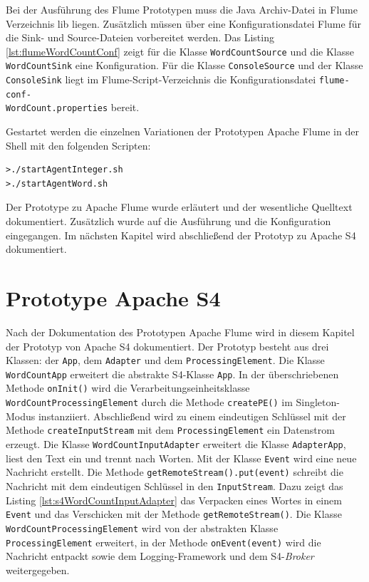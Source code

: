 Bei der Ausführung des Flume Prototypen muss die Java Archiv-Datei in Flume Verzeichnis lib liegen. Zusätzlich müssen über eine Konfigurationsdatei Flume für die Sink- und Source-Dateien vorbereitet werden. Das Listing \ref{lst:flumeWordCountConf} zeigt für die Klasse \texttt{WordCountSource} und die Klasse \texttt{WordCountSink} eine Konfiguration. Für die Klasse \texttt{ConsoleSource} und der Klasse \texttt{ConsoleSink} liegt im Flume-Script-Verzeichnis die Konfigurationsdatei \texttt{flume-conf- \\WordCount.properties} bereit.



Gestartet werden die einzelnen Variationen der Prototypen Apache Flume in der Shell mit den folgenden Scripten:

\begin{verbatim}
>./startAgentInteger.sh
>./startAgentWord.sh
\end{verbatim}

Der Prototype zu Apache Flume wurde erläutert und der wesentliche Quelltext dokumentiert. Zusätzlich wurde auf die Ausführung und die Konfiguration eingegangen. Im nächsten Kapitel wird abschließend der Prototyp zu Apache S4 dokumentiert.


\section{Prototype Apache S4}
\label{sec:prot:s4}

Nach der Dokumentation des Prototypen Apache Flume wird in diesem Kapitel der Prototyp von Apache S4 dokumentiert. Der Prototyp besteht aus drei Klassen: der \texttt{App}, dem \texttt{Adapter} und dem \texttt{ProcessingElement}. Die Klasse \texttt{WordCountApp} erweitert die abstrakte S4-Klasse \texttt{App}. In der überschriebenen Methode \texttt{onInit()} wird die Verarbeitungseinheitsklasse \texttt{WordCountProcessingElement} durch die Methode \texttt{createPE()} im Singleton-Modus instanziiert. Abschließend wird zu einem eindeutigen Schlüssel mit der Methode \texttt{createInputStream} mit dem \texttt{ProcessingElement} ein Datenstrom erzeugt. Die Klasse \texttt{WordCountInputAdapter} erweitert die Klasse \texttt{AdapterApp}, liest den Text ein und trennt nach Worten. Mit der Klasse \texttt{Event} wird eine neue Nachricht erstellt. Die Methode \texttt{getRemoteStream().put(event)} schreibt die Nachricht mit dem eindeutigen Schlüssel in den \texttt{InputStream}. Dazu zeigt das Listing \ref{lst:s4WordCountInputAdapter} das Verpacken eines Wortes in einem \texttt{Event} und das Verschicken mit der Methode \texttt{getRemoteStream()}. Die Klasse \texttt{WordCountProcessingElement} wird von der abstrakten Klasse \texttt{ProcessingElement} erweitert, in der Methode \texttt{onEvent(event)} wird die Nachricht entpackt sowie dem Logging-Framework und dem S4-\textit{Broker} weitergegeben.

